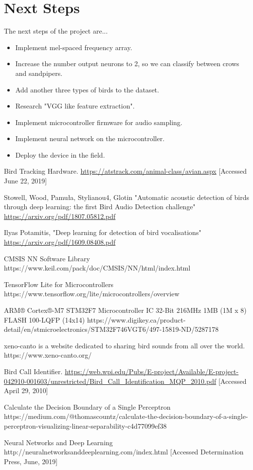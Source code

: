 \documentclass{article}
\begin{document}
\section{Next Steps}
The next steps of the project are...

\begin{itemize}
\item Implement mel-spaced frequency array.
\item Increase the number output neurons to 2, so we can classify between crows and sandpipers. 
\item Add another three types of birds to the dataset.
\item Research "VGG like feature extraction".
\item Implement microcontroller firmware for audio sampling.
\item Implement neural network on the microcontroller.
\item Deploy the device in the field.
\end{itemize}

\begin{thebibliography}{1}

Bird Tracking Hardware.
\url{https://atstrack.com/animal-class/avian.aspx} [Accessed June 22, 2019]

Stowell, Wood, Pamuła, Stylianou4, Glotin "Automatic acoustic detection of birds through deep learning: the first Bird Audio Detection challenge"
\url{https://arxiv.org/pdf/1807.05812.pdf}

Ilyas Potamitis, "Deep learning for detection of bird vocalisations"
\url{https://arxiv.org/pdf/1609.08408.pdf}

CMSIS NN Software Library
https://www.keil.com/pack/doc/CMSIS/NN/html/index.html

TensorFlow Lite for Microcontrollers
https://www.tensorflow.org/lite/microcontrollers/overview

ARM® Cortex®-M7 STM32F7 Microcontroller IC 32-Bit 216MHz 1MB (1M x 8) FLASH 100-LQFP (14x14)
https://www.digikey.ca/product-detail/en/stmicroelectronics/STM32F746VGT6/497-15819-ND/5287178

xeno-canto is a website dedicated to sharing bird sounds from all over the world.
https://www.xeno-canto.org/

Bird Call Identifier.
\url{https://web.wpi.edu/Pubs/E-project/Available/E-project-042910-001603/unrestricted/Bird_Call_Identification_MQP_2010.pdf} [Accessed April 29, 2010]

Calculate the Decision Boundary of a Single Perceptron
https://medium.com/@thomascountz/calculate-the-decision-boundary-of-a-single-perceptron-visualizing-linear-separability-c4d77099ef38

Neural Networks and Deep Learning
http://neuralnetworksanddeeplearning.com/index.html [Accessed Determination Press, June, 2019]

\end{thebibliography}
\end{document}

